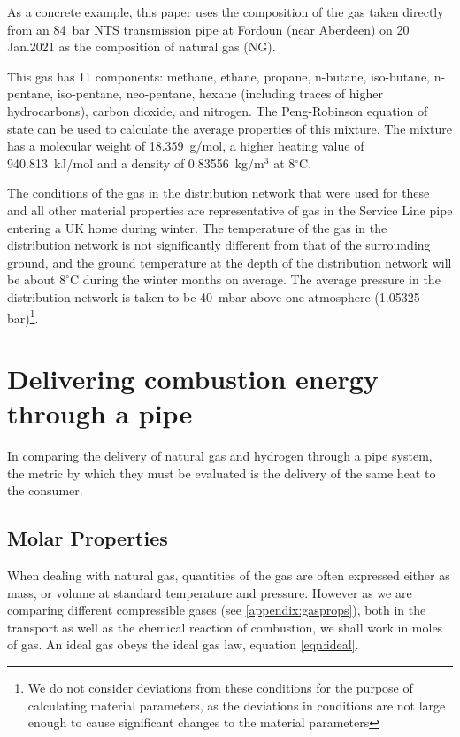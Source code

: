 \documentclass[5p]{elsarticle} %
\begin{document}
As a concrete example, this paper uses the composition of the gas taken directly from an 84~bar NTS transmission pipe at Fordoun (near Aberdeen) on 20 Jan.2021\citep{cngservices2019} as the composition of natural gas (NG). 

This gas has 11 components: methane, ethane, propane, n-butane, iso-butane, n-pentane, iso-pentane, neo-pentane, hexane (including traces of higher hydrocarbons), carbon dioxide, and nitrogen. 
The Peng-Robinson equation of state can be used to calculate the average properties of this mixture\citep{Sargents_github}. 
The mixture has a molecular weight of 18.359~g/mol, a higher heating value of 940.813~kJ/mol and a density of 0.83556~kg/m$^3$ at 8$^\circ$C.

The conditions of the gas in the distribution network that were used for these and all other material properties are representative of gas in the Service Line pipe entering a UK home during winter. 
The temperature of the gas in the distribution network is not significantly different from that of the surrounding ground, and the ground temperature at the depth of the distribution network will be about $8^\circ$C during the winter months on average\citep{MacKay2008}.
The average pressure in the distribution network is taken to be 40~mbar above one atmosphere (1.05325 bar)\citep{ARUP2023,utonomy23}\footnote{We do not consider deviations from these conditions for the purpose of calculating material parameters, as the deviations in conditions are not large enough to cause significant changes to the material parameters}.

\section{Delivering combustion energy through a pipe}
\label{sec:pipe}

In comparing the delivery of natural gas and hydrogen through a pipe system, the metric by which they must be evaluated is the delivery of the same heat to the consumer. 

\subsection{Molar Properties}
\label{sec:molar}

When dealing with natural gas, quantities of the gas are often expressed either as mass, or volume at standard temperature and pressure. 
However as we are comparing different compressible gases (see \ref{appendix:gasprops}), both in the transport as well as the chemical reaction of combustion, we shall work in moles of gas.
An ideal gas obeys the ideal gas law, equation \eqref{eqn:ideal}.
\end{document}
